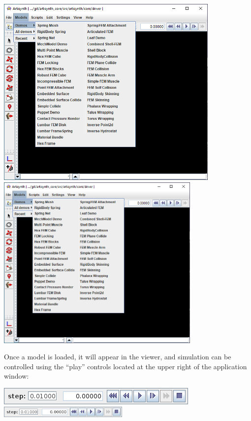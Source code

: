 \begin{center}
\iflatexml
   \includegraphics[]{images/ArtiSynthDemoMenu}
\else
   \includegraphics[width=0.75\textwidth]{images/ArtiSynthDemoMenu}
\fi
\end{center}

Once a model is loaded, it will appear in the viewer, and simulation
can be controlled using the ``play'' controls located at the upper right
of the application window:

\begin{center}
\iflatexml
  \includegraphics[]{../uiguide/images/playControls}
\else
  \includegraphics[width=2.5in]{../uiguide/images/playControls}
\fi
\end{center}

